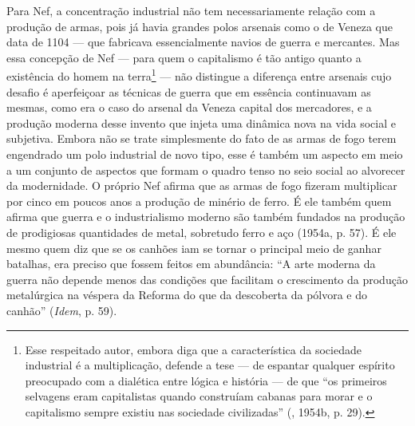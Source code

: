 Para Nef, a concentração industrial não tem necessariamente relação com
a produção de armas, pois já havia grandes polos arsenais como o de
Veneza que data de 1104 --- que fabricava essencialmente navios de guerra
e mercantes. Mas essa concepção de Nef --- para quem o capitalismo é tão
antigo quanto a existência do homem na terra\footnote{Esse respeitado
  autor, embora diga que a característica da sociedade industrial é a
  multiplicação, defende a tese --- de espantar qualquer espírito
  preocupado com a dialética entre lógica e história --- de que ``os
  primeiros selvagens eram capitalistas quando construíam cabanas para
  morar e o capitalismo sempre existiu nas sociedade civilizadas''
  (, 1954b, p. 29).} --- não distingue a diferença entre arsenais cujo
desafio é aperfeiçoar as técnicas de guerra que em essência continuavam
as mesmas, como era o caso do arsenal da Veneza capital dos mercadores,
e a produção moderna desse invento que injeta uma dinâmica nova na vida
social e subjetiva. Embora não se trate simplesmente do fato de as armas
de fogo terem engendrado um polo industrial de novo tipo, esse é também
um aspecto em meio a um conjunto de aspectos que formam o quadro tenso
no seio social ao alvorecer da modernidade. O próprio Nef afirma que as
armas de fogo fizeram multiplicar por cinco em poucos anos a produção de
minério de ferro. É ele também quem afirma que guerra e o industrialismo
moderno são também fundados na produção de prodigiosas quantidades de
metal, sobretudo ferro e aço (1954a, p. 57). É ele mesmo quem diz que
se os canhões iam se tornar o principal meio de ganhar batalhas, era
preciso que fossem feitos em abundância: ``A arte moderna da guerra não
depende menos das condições que facilitam o crescimento da produção
metalúrgica na véspera da Reforma do que da descoberta da pólvora e do
canhão'' (\emph{Idem}, p. 59).

